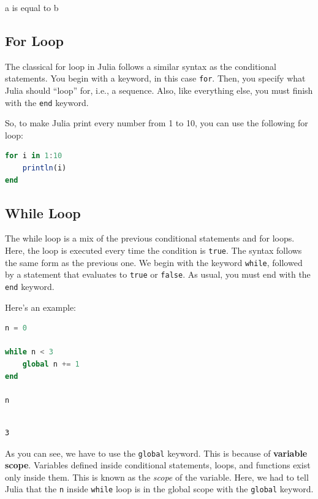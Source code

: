 \documentclass[
  notoc %
]{tufte-book}
\newcommand{\passthrough}[1]{#1}
\begin{document}
a is equal to b

\hypertarget{sec:for}{%
\subsection{For Loop}\label{sec:for}}

The classical for loop in Julia follows a similar syntax as the
conditional statements. You begin with a keyword, in this case
\passthrough{\lstinline!for!}. Then, you specify what Julia should
``loop'' for, i.e., a sequence. Also, like everything else, you must
finish with the \passthrough{\lstinline!end!} keyword.

So, to make Julia print every number from 1 to 10, you can use the
following for loop:

\begin{lstlisting}[language=Julia]
for i in 1:10
    println(i)
end
\end{lstlisting}

\hypertarget{sec:while}{%
\subsection{While Loop}\label{sec:while}}

The while loop is a mix of the previous conditional statements and for
loops. Here, the loop is executed every time the condition is
\passthrough{\lstinline!true!}. The syntax follows the same form as the
previous one. We begin with the keyword \passthrough{\lstinline!while!},
followed by a statement that evaluates to \passthrough{\lstinline!true!}
or \passthrough{\lstinline!false!}. As usual, you must end with the
\passthrough{\lstinline!end!} keyword.

Here's an example:

\begin{lstlisting}[language=Julia]
n = 0

while n < 3
    global n += 1
end

n
\end{lstlisting}

\begin{lstlisting}[language=Output]

3

\end{lstlisting}

As you can see, we have to use the \passthrough{\lstinline!global!}
keyword. This is because of \textbf{variable scope}. Variables defined
inside conditional statements, loops, and functions exist only inside
them. This is known as the \emph{scope} of the variable. Here, we had to
tell Julia that the \passthrough{\lstinline!n!} inside
\passthrough{\lstinline!while!} loop is in the global scope with the
\passthrough{\lstinline!global!} keyword.
\end{document}
